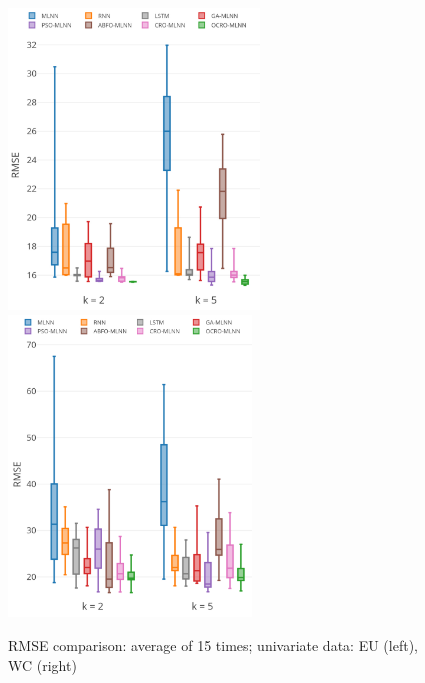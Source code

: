 \documentclass[11pt,twoside]{article}
\begin{document}
\begin{multicols}{2}
\begin{figure}
	\centering
	\begin{minipage}[h]{1\textwidth}
		\centering
		\includegraphics[width=0.45\textwidth =0cm 0cm 0cm 0cm, height = 8cm]{images/pdf/stability/st_eu_2.pdf}
		\centering
		\includegraphics[width=0.45\textwidth =0cm 0cm 0cm 0cm, height = 8cm]{images/pdf/stability/st_wc_2.pdf}
	\end{minipage}
	\caption{RMSE comparison: average of 15 times; univariate data: EU (left), WC (right)} 
	\label{fig:stability_uni}
\end{figure}


\end{multicols}
\end{document}
